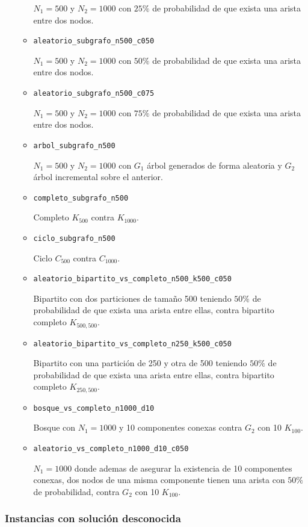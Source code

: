 \begin{itemize}
\begin{itemize}
			$N_1 = 500$ y $N_2 = 1000$ con $25\%$ de probabilidad de que exista
			una arista entre dos nodos.
		\item \texttt{aleatorio\_subgrafo\_n500\_c050}

			$N_1 = 500$ y $N_2 = 1000$ con $50\%$ de probabilidad de que exista
			una arista entre dos nodos.
		\item \texttt{aleatorio\_subgrafo\_n500\_c075}

			$N_1 = 500$ y $N_2 = 1000$ con $75\%$ de probabilidad de que exista
			una arista entre dos nodos.
		\item \texttt{arbol\_subgrafo\_n500}

			$N_1 = 500$ y $N_2 = 1000$ con $G_1$ árbol generados de forma
			aleatoria y $G_2$ árbol incremental sobre el anterior.
		\item \texttt{completo\_subgrafo\_n500}

			Completo $K_{500}$ contra $K_{1000}$.
		\item \texttt{ciclo\_subgrafo\_n500}

			Ciclo $C_{500}$ contra $C_{1000}$.
		\item \texttt{aleatorio\_bipartito\_vs\_completo\_n500\_k500\_c050}

			Bipartito con dos particiones de tamaño 500 teniendo $50\%$ de probabilidad de que exista una
			arista entre ellas, contra bipartito completo $K_{500,500}$.
		\item \texttt{aleatorio\_bipartito\_vs\_completo\_n250\_k500\_c050}

			Bipartito con una partición de 250 y otra de 500 teniendo $50\%$ de probabilidad de que exista una
			arista entre ellas, contra bipartito completo $K_{250,500}$.
		\item \texttt{bosque\_vs\_completo\_n1000\_d10}

			Bosque con $N_1 = 1000$ y 10 componentes conexas contra $G_2$ con 10
			$K_{100}$.
		\item \texttt{aleatorio\_vs\_completo\_n1000\_d10\_c050}

			$N_1 = 1000$ donde ademas de asegurar la existencia de 10
			componentes conexas, dos nodos de una misma componente tienen una
			arista con $50\%$ de probabilidad, contra $G_2$ con 10 $K_{100}$.
	\end{itemize}
\end{itemize}

\subsubsection*{Instancias con solución desconocida}

